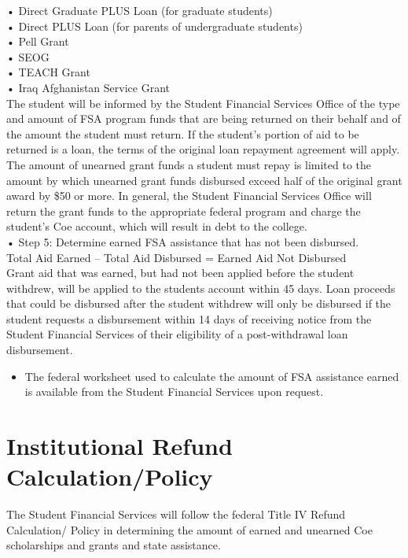 \documentclass[
  letterpaper,
]{scrbook}
\providecommand{\tightlist}{%
  \setlength{\itemsep}{0pt}\setlength{\parskip}{0pt}}
\begin{document}
• Direct Graduate PLUS Loan (for graduate students)\\
• Direct PLUS Loan (for parents of undergraduate students)\\
• Pell Grant\\
• SEOG\\
• TEACH Grant\\
• Iraq Afghanistan Service Grant\\
The student will be informed by the Student Financial Services Office of
the type and amount of FSA program funds that are being returned on
their behalf and of the amount the student must return. If the student's
portion of aid to be returned is a loan, the terms of the original loan
repayment agreement will apply. The amount of unearned grant funds a
student must repay is limited to the amount by which unearned grant
funds disbursed exceed half of the original grant award by \$50 or more.
In general, the Student Financial Services Office will return the grant
funds to the appropriate federal program and charge the student's Coe
account, which will result in debt to the college.\\
• Step 5: Determine earned FSA assistance that has not been disbursed.\\
Total Aid Earned -- Total Aid Disbursed = Earned Aid Not Disbursed\\
Grant aid that was earned, but had not been applied before the student
withdrew, will be applied to the students account within 45 days. Loan
proceeds that could be disbursed after the student withdrew will only be
disbursed if the student requests a disbursement within 14 days of
receiving notice from the Student Financial Services of their
eligibility of a post-withdrawal loan disbursement.

\begin{itemize}
\tightlist
\item
  The federal worksheet used to calculate the amount of FSA assistance
  earned is available from the Student Financial Services upon request.
\end{itemize}

\section{Institutional Refund
Calculation/Policy}\label{institutional-refund-calculationpolicy}

The Student Financial Services will follow the federal Title IV Refund
Calculation/ Policy in determining the amount of earned and unearned Coe
scholarships and grants and state assistance.
\end{document}
